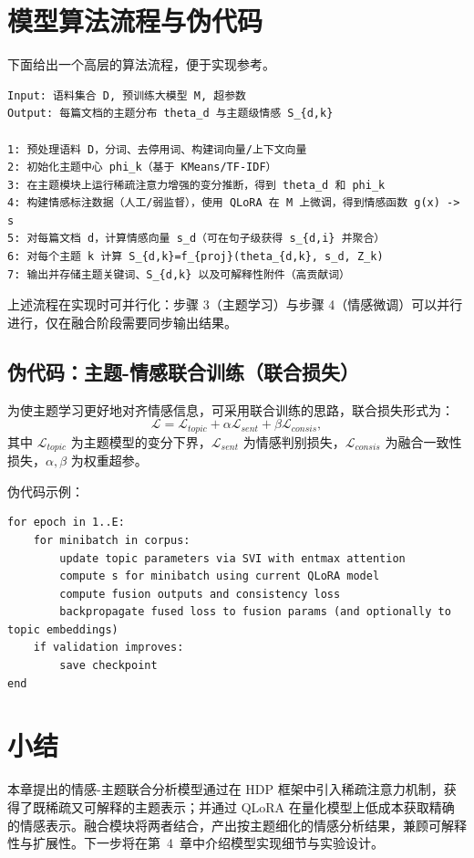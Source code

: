 \section{模型算法流程与伪代码}
\label{sec:algorithms}
下面给出一个高层的算法流程，便于实现参考。

\begin{verbatim}
Input: 语料集合 D, 预训练大模型 M, 超参数
Output: 每篇文档的主题分布 theta_d 与主题级情感 S_{d,k}

1: 预处理语料 D，分词、去停用词、构建词向量/上下文向量
2: 初始化主题中心 phi_k（基于 KMeans/TF-IDF）
3: 在主题模块上运行稀疏注意力增强的变分推断，得到 theta_d 和 phi_k
4: 构建情感标注数据（人工/弱监督），使用 QLoRA 在 M 上微调，得到情感函数 g(x) -> s
5: 对每篇文档 d，计算情感向量 s_d（可在句子级获得 s_{d,i} 并聚合）
6: 对每个主题 k 计算 S_{d,k}=f_{proj}(theta_{d,k}, s_d, Z_k)
7: 输出并存储主题关键词、S_{d,k} 以及可解释性附件（高贡献词）
\end{verbatim}

上述流程在实现时可并行化：步骤 3（主题学习）与步骤 4（情感微调）可以并行进行，仅在融合阶段需要同步输出结果。

\subsection{伪代码：主题-情感联合训练（联合损失）}
为使主题学习更好地对齐情感信息，可采用联合训练的思路，联合损失形式为：
$$\mathcal{L}=\mathcal{L}_{topic}+\alpha\mathcal{L}_{sent}+\beta\mathcal{L}_{consis},$$
其中 $\mathcal{L}_{topic}$ 为主题模型的变分下界，$\mathcal{L}_{sent}$ 为情感判别损失，$\mathcal{L}_{consis}$ 为融合一致性损失，$\alpha,\beta$ 为权重超参。

伪代码示例：
\begin{verbatim}
for epoch in 1..E:
	for minibatch in corpus:
		update topic parameters via SVI with entmax attention
		compute s for minibatch using current QLoRA model
		compute fusion outputs and consistency loss
		backpropagate fused loss to fusion params (and optionally to topic embeddings)
	if validation improves:
		save checkpoint
end
\end{verbatim}

\section{小结}
本章提出的情感-主题联合分析模型通过在 HDP 框架中引入稀疏注意力机制，获得了既稀疏又可解释的主题表示；并通过 QLoRA 在量化模型上低成本获取精确的情感表示。融合模块将两者结合，产出按主题细化的情感分析结果，兼顾可解释性与扩展性。下一步将在第~4~章中介绍模型实现细节与实验设计。

